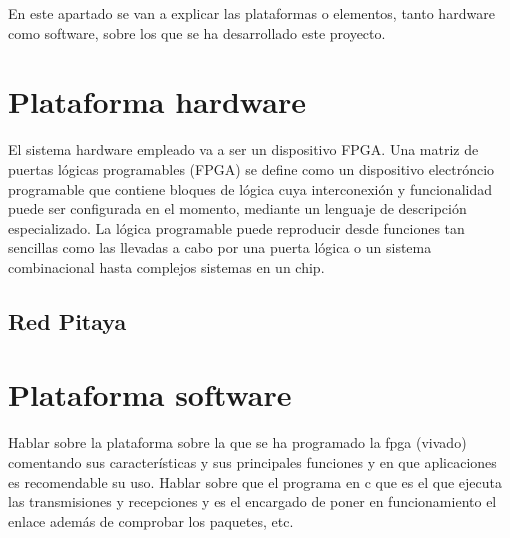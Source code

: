 En este apartado se van a explicar las plataformas o elementos, tanto hardware como software, sobre los que se ha desarrollado este proyecto. 
\vspace{1cm}
\label{chp:ManLaTeX}
\minitoc

\section{Plataforma hardware}
El sistema hardware empleado va a ser un dispositivo FPGA. Una matriz de puertas lógicas programables
(FPGA) se define como un dispositivo electróncio programable que contiene bloques de lógica cuya 
interconexión y funcionalidad puede ser configurada en el momento, mediante un lenguaje de descripción especializado. La lógica programable puede 
reproducir desde funciones tan sencillas como las llevadas a cabo por una puerta lógica o un sistema combinacional hasta complejos sistemas en un chip. 

\subsection{Red Pitaya}

\section{Plataforma software}
Hablar sobre la plataforma sobre la que se ha programado la fpga (vivado) comentando sus características y sus 
principales funciones y en que aplicaciones es recomendable su uso.
Hablar sobre que el programa en c que es el que ejecuta las transmisiones y recepciones y es el encargado de poner en
funcionamiento el enlace además de comprobar los paquetes, etc.

\chapterend{}